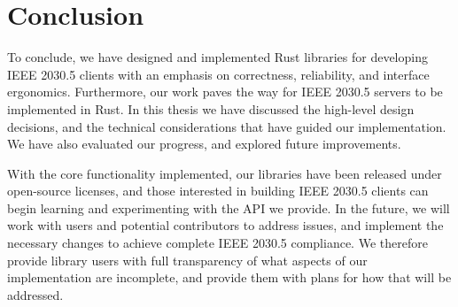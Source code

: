 \chapter{Conclusion}\label{ch:conclusion}
To conclude, we have designed and implemented Rust libraries for developing IEEE 2030.5 clients with an emphasis on correctness, reliability, and interface ergonomics. Furthermore, our work paves the way for IEEE 2030.5 servers to be implemented in Rust. In this thesis we have discussed the high-level design decisions, and the technical considerations that have guided our implementation. We have also evaluated our progress, and explored future improvements.

With the core functionality implemented, our libraries have been released under open-source licenses, and those interested in building IEEE 2030.5 clients can begin learning and experimenting with the API we provide.
In the future, we will work with users and potential contributors to address issues, and implement the necessary changes to achieve complete IEEE 2030.5 compliance. We therefore provide library users with full transparency of what aspects of our implementation are incomplete, and provide them with plans for how that will be addressed.